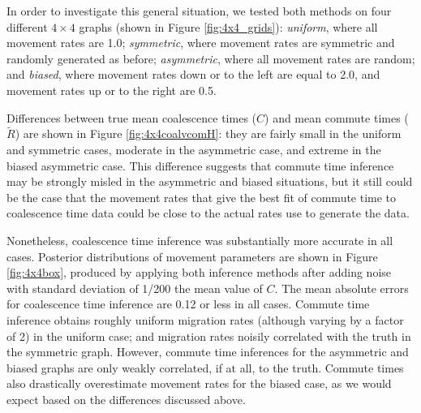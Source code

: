 \documentclass{article}
\newcommand{\comdist}{\widetilde R}
\begin{document}
In order to investigate this general situation,
we tested both methods on four different $4 \times 4$ graphs (shown in Figure \ref{fig:4x4_grids}):
\emph{uniform}, where all movement rates are 1.0;
\emph{symmetric}, where movement rates are symmetric and randomly generated as before;
\emph{asymmetric}, where all movement rates are random;
and \emph{biased}, where movement rates down or to the left are equal to 2.0,
and movement rates up or to the right are 0.5.

Differences between true mean coalescence times ($C$) and mean commute times ($\comdist$) 
are shown in Figure \ref{fig:4x4coalvcomH}:
they are fairly small in the uniform and symmetric cases, moderate in the asymmetric case, 
and extreme in the biased asymmetric case.
This difference suggests that commute time inference may be strongly misled 
in the asymmetric and biased situations,
but it still could be the case that the movement rates that give the best fit of commute time
to coalescence time data could be close to the actual rates use to generate the data.

Nonetheless, 
coalescence time inference was substantially more accurate in all cases.
Posterior distributions of movement parameters are shown in Figure \ref{fig:4x4box},
produced by applying both inference methods
after adding noise with standard deviation of 1/200 the mean value of $C$.
The mean absolute errors for coalescence time inference are 0.12 or less in all cases.
Commute time inference obtains roughly uniform migration rates
(although varying by a factor of 2) in the uniform case;
and migration rates noisily correlated with the truth in the symmetric graph.
However, commute time inferences for the asymmetric and biased graphs are only weakly correlated, 
if at all, to the truth.
Commute times also drastically overestimate movement rates for the biased case,
as we would expect based on the differences discussed above.
\end{document}

